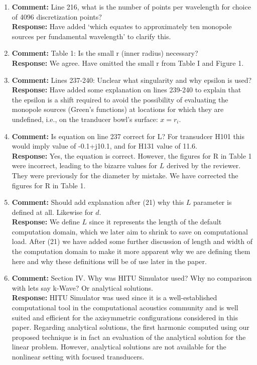 \documentclass[11pt]{article}
\begin{document}
\begin{enumerate}
	 \item \textbf{Comment:} Line 216, what is the number of points per wavelength 
	 for choice of 4096 discretization points? \\
	 \textbf{Response:} Have added `which equates to approximately 
	 ten monopole sources per fundamental wavelength' to clarify this.
	
	 \item \textbf{Comment:} Table 1: Is the small r (inner radius) necessary? \\
	\textbf{Response:} We agree. Have omitted the small r from Table I and Figure 1.
	
	\item \textbf{Comment:} Lines 237-240: Unclear what singularity and why epsilon is used? \\
	\textbf{Response:} Have added some explanation on lines 239-240 to explain 
	that the epsilon is a shift required to avoid the possibility of evaluating 
	the monopole sources (Green's functions) at locations for which they are undefined, 
	i.e., on the tranducer bowl's surface: $x=r_i$.
	
	\item \textbf{Comment:} Is equation on line 237 correct for L? For transudcer H101 this would imply value of -0.1+j10.1, and for H131 value of 11.6. \\
	\textbf{Response:} Yes, the equation is correct. However, the figures for R 
	in Table 1 were incorrect, leading to the bizarre values for $L$ derived by the reviewer. They were previously for the diameter by mistake.
	We have corrected the figures for R in Table 1.
	
	\item \textbf{Comment:} Should add explanation after (21) why this $L$ parameter is defined at all. Likewise for $d$. \\
	\textbf{Response:} We define $L$ since it represents the length of the default computation domain,
	which we later aim to shrink to save on computational load. After (21) we have added some 
	further discussion of length and width of the computation domain to make it more apparent 
	why we are defining them here and why these definitions will be of use later in the paper.
	
	\item \textbf{Comment:} Section IV. Why was HITU Simulator used? Why no comparison with lets say k-Wave? Or analytical solutions. \\
	\textbf{Response:} HITU Simulator was used since it is a well-established computational tool in the 
	computational acoustics community and is well suited and efficient for the axisymmetric configurations considered in this paper. 
	Regarding analytical solutions, the first harmonic computed using our proposed technique is in fact an evaluation 
	of the analytical solution for the linear problem. However, analytical solutions are not available for the nonlinear setting with focused transducers.


\end{enumerate}
\end{document}
